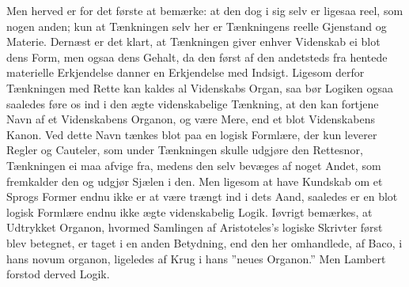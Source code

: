 \documentclass[12pt]{book}
\def\textit#1{#1}%
\def\emph#1{#1}%
\newcommand{\opage}[1]{\marginnote{\footnotesize\textit{[#1]}}}
\begin{document}
Men herved er for det første at bemærke: at den dog i sig selv er ligesaa
reel, som nogen anden; kun at Tænkningen selv her er Tænkningens reelle
Gjenstand og Materie. Dernæst er det klart, at Tænkningen giver enhver
Videnskab ei blot dens \emph{Form}, men ogsaa dens \emph{Gehalt}, da den først
af den andetsteds fra
\opage{8} hentede \emph{materielle Erkjendelse} danner en \emph{Erkjendelse med Indsigt}.
Ligesom derfor Tænkningen med Rette kan kaldes al Videnskabs \emph{Organ}, saa
bør Logiken ogsaa saaledes føre os ind i den ægte videnskabelige Tænkning, at
den kan fortjene Navn af et Videnskabens \emph{Organon}, og være Mere, end et
blot Videnskabens \emph{Kanon}. Ved dette Navn tænkes blot paa en logisk
\emph{Formlære}, der kun leverer Regler og Cauteler, som under Tænkningen
skulle udgjøre den Rettesnor, Tænkningen ei maa afvige fra, medens den selv
bevæges af noget Andet, som fremkalder den og udgjør Sjælen i den. Men ligesom
at have Kundskab om et Sprogs Former endnu ikke er at være trængt ind i dets
Aand, saaledes er en blot logisk Formlære endnu ikke ægte videnskabelig Logik.
Iøvrigt bemærkes, at Udtrykket \emph{Organon}, hvormed Samlingen af
Aristoteles's logiske Skrivter først blev betegnet, er taget i en anden
Betydning, end den her omhandlede, af \emph{Baco}, i hans \textit{novum
organon}, ligeledes af \emph{Krug} i hans ''\emph{neues Organon}.'' Men
\emph{Lambert} forstod derved Logik.
\end{document}
